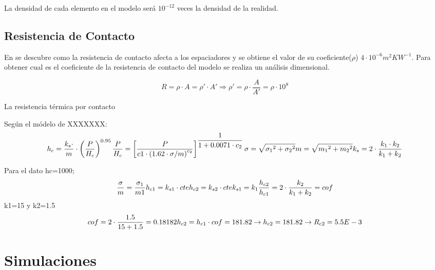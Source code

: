La densidad de cada elemento en el modelo será $10^{-12}$ veces la densidad de la realidad.

\subsection{Resistencia de Contacto}
En \cite{nf_TPV_Pillars_SiO2} se descubre como la resistencia de contacto afecta a los espaciadores y se obtiene el valor de su coeficiente($\rho$) $4\cdot 10^{-6}m^2 KW^{-1} $. Para obtener cual es el coeficiente de la resistencia de contacto del modelo se realiza un análisis dimensional.

\begin{equation}
	R= \rho \cdot A =\rho ' \cdot A' \Longrightarrow \rho '=\rho \cdot \dfrac{A}{A'}=\rho \cdot 10^8
\end{equation}

La resistencia térmica por contacto

Según el módelo de XXXXXXX:
\begin{equation}
	h_c=\dfrac{k_s\cdot}{m}\cdot \left( \dfrac{P}{H_c} \right)^{0.95} \\ \dfrac{P}{H_c} = \left[ \dfrac{P}{c1\cdot \left(1.62\cdot \sigma/m \right)^{c_2}}\right]^{\dfrac{1}{1+0.0071\cdot c_2}} \\	\sigma =\sqrt{{\sigma_1}^2+{\sigma_2}^2} \\ m=\sqrt{{m_1}^2+{m_2}^2}	\\ k_s=2\cdot \dfrac{k_1\cdot k_2}{k_1+k_2}
\end{equation}

Para el dato hc=1000;
\begin{equation}
	\dfrac{\sigma}{m}=\dfrac{\sigma_1}{m1}	\\ h_{c1}=k_{s1}\cdot cte \\ h_{c2}=k_{s2}\cdot cte	\\ k_{s1}=k_1 \\ \dfrac{h_{c2}}{h_{c1}}= 2\cdot \dfrac{k_2}{k_1+k_2}=cof
\end{equation}
k1=15 y k2=1.5
\begin{equation}
	cof=2\cdot \dfrac{1.5}{15+1.5}=0.18182
	\\ h_{c2}=h_{c1}\cdot cof=181.82 \rightarrow h_{c2}=181.82 \rightarrow R_{c2}=5.5E-3
\end{equation}

\section{Simulaciones}
